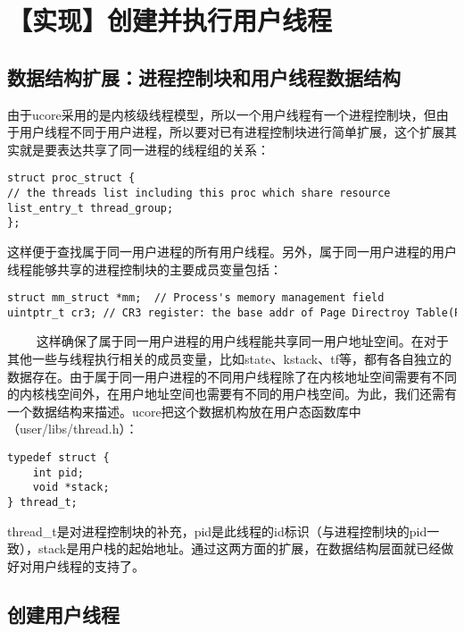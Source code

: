 \section{【实现】创建并执行用户线程}\label{ux5b9eux73b0ux521bux5efaux5e76ux6267ux884cux7528ux6237ux7ebfux7a0b}

\subsection{数据结构扩展：进程控制块和用户线程数据结构}\label{ux6570ux636eux7ed3ux6784ux6269ux5c55ux8fdbux7a0bux63a7ux5236ux5757ux548cux7528ux6237ux7ebfux7a0bux6570ux636eux7ed3ux6784}

由于ucore采用的是内核级线程模型，所以一个用户线程有一个进程控制块，但由于用户线程不同于用户进程，所以要对已有进程控制块进行简单扩展，这个扩展其实就是要表达共享了同一进程的线程组的关系：

\begin{lstlisting}
struct proc_struct {
// the threads list including this proc which share resource
list_entry_t thread_group;                   
};
\end{lstlisting}

这样便于查找属于同一用户进程的所有用户线程。另外，属于同一用户进程的用户线程能够共享的进程控制块的主要成员变量包括：

\begin{lstlisting}
struct mm_struct *mm;  // Process's memory management field
uintptr_t cr3; // CR3 register: the base addr of Page Directroy Table(PDT)
\end{lstlisting}

~~~~
这样确保了属于同一用户进程的用户线程能共享同一用户地址空间。在对于其他一些与线程执行相关的成员变量，比如state、kstack、tf等，都有各自独立的数据存在。由于属于同一用户进程的不同用户线程除了在内核地址空间需要有不同的内核栈空间外，在用户地址空间也需要有不同的用户栈空间。为此，我们还需有一个数据结构来描述。ucore把这个数据机构放在用户态函数库中（user/libs/thread.h）：

\begin{lstlisting}
typedef struct {
    int pid;
    void *stack;
} thread_t;
\end{lstlisting}

thread\_t是对进程控制块的补充，pid是此线程的id标识（与进程控制块的pid一致），stack是用户栈的起始地址。通过这两方面的扩展，在数据结构层面就已经做好对用户线程的支持了。

\subsection{创建用户线程}\label{ux521bux5efaux7528ux6237ux7ebfux7a0b}

